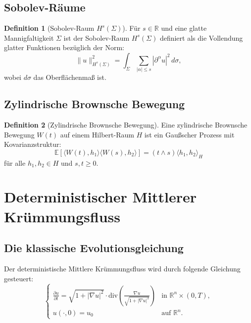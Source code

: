 \documentclass[a4paper,12pt]{article}
\theoremstyle{definition}
\newtheorem{definition}{Definition}
\begin{document}
\subsection{Sobolev-Räume}

\begin{definition}[Sobolev-Raum $H^s(\Sigma)$]
	Für $s \in \mathbb{R}$ und eine glatte Mannigfaltigkeit $\Sigma$ ist der Sobolev-Raum $H^s(\Sigma)$ definiert als die Vollendung glatter Funktionen bezüglich der Norm:
	\[
	\|u\|_{H^s(\Sigma)}^2 = \int_\Sigma \sum_{|\alpha| \leq s} |\partial^\alpha u|^2 \, d\sigma,
	\]
	wobei $d\sigma$ das Oberflächenmaß ist.
\end{definition}

\subsection{Zylindrische Brownsche Bewegung}

\begin{definition}[Zylindrische Brownsche Bewegung]
	Eine zylindrische Brownsche Bewegung $W(t)$ auf einem Hilbert-Raum $H$ ist ein Gaußscher Prozess mit Kovarianzstruktur:
	\[
	\mathbb{E}[\langle W(t), h_1 \rangle \langle W(s), h_2 \rangle] = (t \wedge s) \langle h_1, h_2 \rangle_H
	\]
	für alle $h_1, h_2 \in H$ und $s,t \geq 0$.
\end{definition}

\section{Deterministischer Mittlerer Krümmungsfluss}
\label{sec:deterministic}

\subsection{Die klassische Evolutionsgleichung}

Der deterministische Mittlere Krümmungsfluss wird durch folgende Gleichung gesteuert:
\begin{equation}
\label{eq:mcf_deterministic}
\begin{cases}
\frac{\partial u}{\partial t} = \sqrt{1 + |\nabla u|^2} \cdot \text{div}\left( \frac{\nabla u}{\sqrt{1 + |\nabla u|^2}} \right) & \text{in } \mathbb{R}^n \times (0,T), \\
u(\cdot, 0) = u_0 & \text{auf } \mathbb{R}^n.
\end{cases}
\end{equation}
\end{document}

